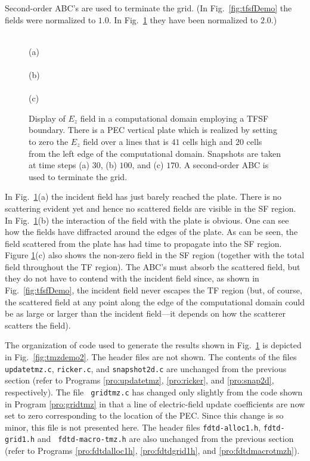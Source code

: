 Second-order ABC's are used to terminate the grid.  (In Fig.\
\ref{fig:tfsfDemo} the fields were normalized to $1.0$.  In 
Fig.\ \ref{fig:tfsfPecDemo} they have been normalized to $2.0$.)
\begin{figure}
  \begin{center}
   \\
  (a) \\
   \\
  (b) \\
   \\
  (c) \end{center} \caption{Display of $E_z$ field in a computational
  domain employing a TFSF boundary.  There is a PEC vertical plate
  which is realized by setting to zero the $E_z$ field over a lines
  that is $41$ cells high and $20$ cells from the left edge of the
  computational domain.  Snapshots are taken at time steps (a) $30$,
  (b) $100$, and (c) $170$.  A second-order ABC is used to terminate
  the grid.}  \label{fig:tfsfPecDemo}
\end{figure}

In Fig.\ \ref{fig:tfsfPecDemo}(a) the incident field has just barely
reached the plate.  There is no scattering evident yet and
hence no scattered fields are visible in the SF region.  In Fig.\
\ref{fig:tfsfPecDemo}(b) the interaction of the field with the plate
is obvious.  One can see how the fields have diffracted around the
edges of the plate.  As can be seen, the field scattered from the
plate has had time to propagate into the SF region.  Figure
\ref{fig:tfsfPecDemo}(c) also shows the non-zero field in the SF
region (together with the total field throughout the TF region).  The
ABC's must absorb the scattered field, but they do not have to contend
with the incident field since, as shown in Fig.\
\ref{fig:tfsfDemo}, the incident field never escapes the TF region
(but, of course, the scattered field at any point along the edge of
the computational domain could be as large or larger than the incident
field---it depends on how the scatterer scatters the field).

The organization of code used to generate the results shown in Fig.\
\ref{fig:tfsfPecDemo} is depicted in Fig.\ \ref{fig:tmzdemo2}.  The
header files are not shown.  The contents of the files {\tt
updatetmz.c}, {\tt ricker.c}, and {\tt snapshot2d.c} are unchanged
from the previous section (refer to Programs \ref{pro:updatetmz},
\ref{pro:ricker}, and \ref{pro:snap2d}, respectively).  The file {\tt
gridtmz.c} has changed only slightly from the code shown in Program
\ref{pro:gridtmz} in that a line of electric-field update coefficients
are now set to zero corresponding to the location of the PEC.  Since
this change is so minor, this file is not presented here.  The header
files {\tt fdtd-alloc1.h}, {\tt fdtd-grid1.h} and {\tt
fdtd-macro-tmz.h} are also unchanged from the previous section (refer
to Programs \ref{pro:fdtdalloc1h}, \ref{pro:fdtdgrid1h}, and
\ref{pro:fdtdmacrotmzh}).

